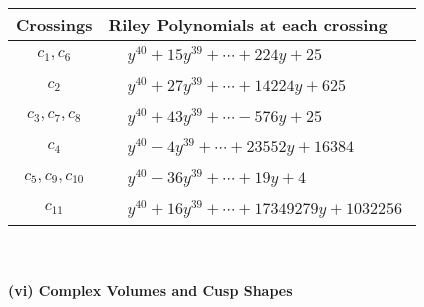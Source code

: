 \documentclass[1p]{elsarticle_modified}
\theoremstyle{definition}
\begin{document}
\begin{tabular}{m{50pt}|m{274pt}}
Crossings & \hspace{64pt}Riley Polynomials at each crossing \\
\hline $$\begin{aligned}c_{1},c_{6}\end{aligned}$$&$\begin{aligned}
&y^{40}+15 y^{39}+\cdots+224 y+25
\end{aligned}$\\
\hline $$\begin{aligned}c_{2}\end{aligned}$$&$\begin{aligned}
&y^{40}+27 y^{39}+\cdots+14224 y+625
\end{aligned}$\\
\hline $$\begin{aligned}c_{3},c_{7},c_{8}\end{aligned}$$&$\begin{aligned}
&y^{40}+43 y^{39}+\cdots-576 y+25
\end{aligned}$\\
\hline $$\begin{aligned}c_{4}\end{aligned}$$&$\begin{aligned}
&y^{40}-4 y^{39}+\cdots+23552 y+16384
\end{aligned}$\\
\hline $$\begin{aligned}c_{5},c_{9},c_{10}\end{aligned}$$&$\begin{aligned}
&y^{40}-36 y^{39}+\cdots+19 y+4
\end{aligned}$\\
\hline $$\begin{aligned}c_{11}\end{aligned}$$&$\begin{aligned}
&y^{40}+16 y^{39}+\cdots+17349279 y+1032256
\end{aligned}$\\
\hline
\end{tabular}\\~\\
\newpage\flushleft \textbf{(vi) Complex Volumes and Cusp Shapes}
\end{document}
